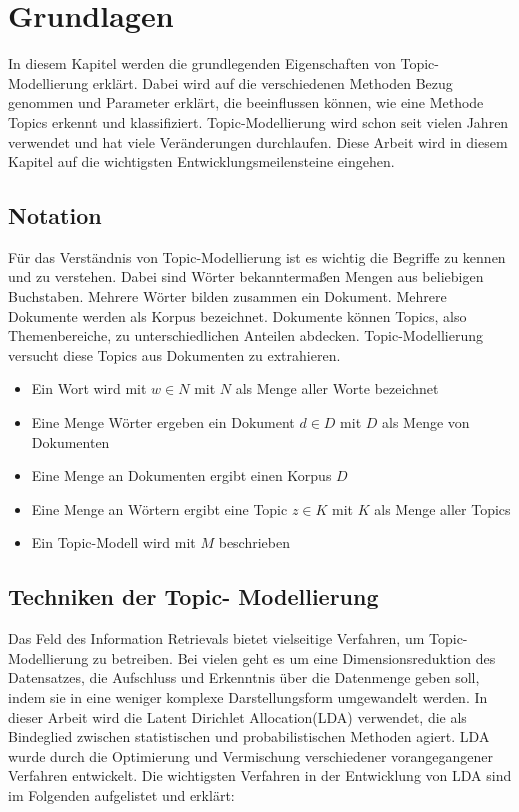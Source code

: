 \documentclass[german,version-2020-11]{uzl-thesis}
\begin{document}
\chapter{Grundlagen}%

In diesem Kapitel werden die grundlegenden Eigenschaften von Topic-Modellierung erklärt. Dabei wird auf die verschiedenen Methoden Bezug genommen und Parameter erklärt, die beeinflussen können, wie eine Methode Topics erkennt und klassifiziert. Topic-Modellierung wird schon seit vielen Jahren verwendet und hat viele Veränderungen durchlaufen. Diese Arbeit wird in diesem Kapitel auf die wichtigsten Entwicklungsmeilensteine eingehen.

\section{Notation}
Für das Verständnis von Topic-Modellierung ist es wichtig die Begriffe zu kennen und zu verstehen. Dabei sind Wörter bekanntermaßen Mengen aus beliebigen Buchstaben. Mehrere Wörter bilden zusammen ein Dokument. Mehrere Dokumente werden als Korpus bezeichnet. Dokumente können Topics, also Themenbereiche, zu unterschiedlichen Anteilen abdecken. Topic-Modellierung versucht diese Topics aus Dokumenten zu extrahieren.

\begin{itemize}
	\item Ein Wort wird mit $w \in N$ mit $N$ als Menge aller Worte bezeichnet
	\item Eine Menge Wörter ergeben ein Dokument $d \in D$ mit $D$ als Menge von Dokumenten
	\item Eine Menge an Dokumenten ergibt einen Korpus $D$
	\item Eine Menge an Wörtern ergibt eine Topic $z \in K$ mit $K$ als Menge aller Topics
	\item Ein Topic-Modell wird mit $M$ beschrieben
\end{itemize}


\section{Techniken der Topic- Modellierung}

Das Feld des Information Retrievals bietet vielseitige Verfahren, um Topic-Modellierung zu betreiben. Bei vielen geht es um eine Dimensionsreduktion des Datensatzes, die Aufschluss und Erkenntnis über die Datenmenge geben soll, indem sie in eine weniger komplexe Darstellungsform umgewandelt werden. In dieser Arbeit wird die Latent Dirichlet Allocation(LDA) verwendet, die als Bindeglied zwischen statistischen und probabilistischen Methoden agiert. LDA wurde durch die Optimierung und Vermischung verschiedener vorangegangener Verfahren entwickelt. Die wichtigsten Verfahren in der Entwicklung von LDA sind im Folgenden aufgelistet und erklärt: 
\end{document}
